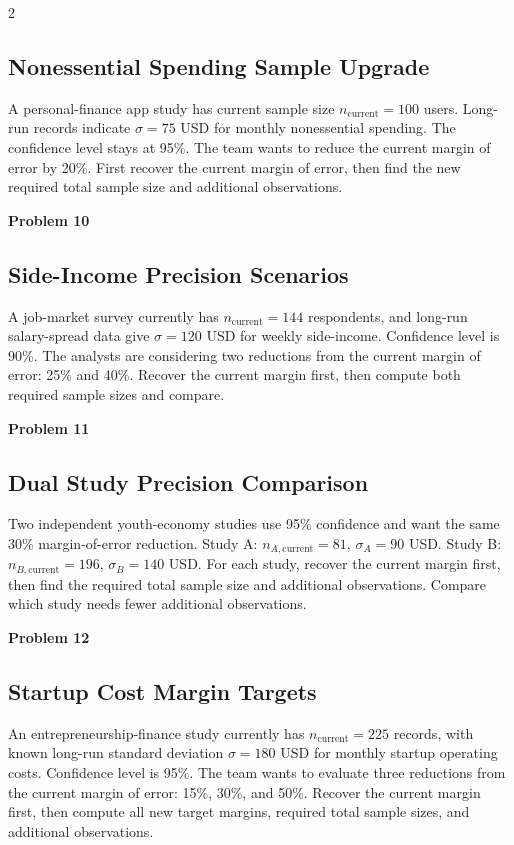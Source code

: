 \documentclass[12pt]{article}
\newcommand{\SubsectionBox}[1]{%
\noindent\colorbox{gray!30}{\parbox{\linewidth}{\textbf{#1}}}\par\vspace{0.35cm}%
}
\begin{document}
\begin{multicols}{2}
\subsection*{Nonessential Spending Sample Upgrade}
A personal-finance app study has current sample size $n_{\text{current}} = 100$ users. Long-run records indicate $\sigma = 75$ USD for monthly nonessential spending. The confidence level stays at 95\%. The team wants to reduce the current margin of error by 20\%. First recover the current margin of error, then find the new required total sample size and additional observations.

\vspace{0.5cm}
\SubsectionBox{Problem 10}
\subsection*{Side-Income Precision Scenarios}
A job-market survey currently has $n_{\text{current}} = 144$ respondents, and long-run salary-spread data give $\sigma = 120$ USD for weekly side-income. Confidence level is 90\%. The analysts are considering two reductions from the current margin of error: 25\% and 40\%. Recover the current margin first, then compute both required sample sizes and compare.

\vspace{0.5cm}
\SubsectionBox{Problem 11}
\subsection*{Dual Study Precision Comparison}
Two independent youth-economy studies use 95\% confidence and want the same 30\% margin-of-error reduction.
		Study A: $n_{A,\text{current}} = 81$, $\sigma_A = 90$ USD.
		Study B: $n_{B,\text{current}} = 196$, $\sigma_B = 140$ USD.
		For each study, recover the current margin first, then find the required total sample size and additional observations. Compare which study needs fewer additional observations.

\vspace{0.5cm}
\SubsectionBox{Problem 12}
\subsection*{Startup Cost Margin Targets}
An entrepreneurship-finance study currently has $n_{\text{current}} = 225$ records, with known long-run standard deviation $\sigma = 180$ USD for monthly startup operating costs. Confidence level is 95\%. The team wants to evaluate three reductions from the current margin of error: 15\%, 30\%, and 50\%. Recover the current margin first, then compute all new target margins, required total sample sizes, and additional observations.

\end{multicols}
\end{document}

